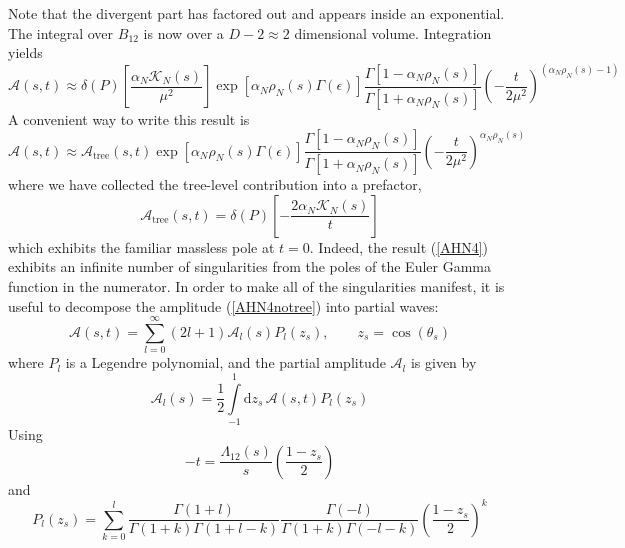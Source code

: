 Note that the divergent part has factored out and appears inside an exponential. The integral over $B_{12}$ is now over a $D - 2 \approx 2$ dimensional volume. Integration yields
\begin{equation}
	\mathcal{A}(s, t) \approx \delta(P) \left[ \frac{\alpha_{N} \mathcal{K}_{N}(s)}{\mu^{2}} \right] \exp{\left[ \alpha_{N} \rho_{N}(s) \Gamma(\epsilon) \right]} \frac{\Gamma[1 - \alpha_{N} \rho_{N}(s)]}{\Gamma[1 + \alpha_{N} \rho_{N}(s)]} \left( - \frac{t}{2 \mu^{2}} \right)^{(\alpha_{N} \rho_{N}(s) - 1)} \label{AHN4notree}
\end{equation}
A convenient way to write this result is
\begin{equation}
	\mathcal{A}(s, t) \approx \mathcal{A}_{\text{tree}}(s, t) \exp{\left[ \alpha_{N} \rho_{N}(s) \Gamma(\epsilon) \right]} \frac{\Gamma[1 - \alpha_{N} \rho_{N}(s)]}{\Gamma[1 + \alpha_{N} \rho_{N}(s)]} \left( - \frac{t}{2 \mu^{2}} \right)^{\alpha_{N} \rho_{N}(s)} \label{AHN4}
\end{equation}
where we have collected the tree-level contribution into a prefactor,
\begin{equation}
	\mathcal{A}_{\text{tree}}(s, t) = \delta(P) \left[ - \frac{2 \alpha_{N} \mathcal{K}_{N}(s)}{t} \right]
\end{equation}
which exhibits the familiar massless pole at $t = 0$. Indeed, the result (\ref{AHN4}) exhibits an infinite number of singularities from the poles of the Euler Gamma function in the numerator. In order to make all of the singularities manifest, it is useful to decompose the amplitude (\ref{AHN4notree}) into partial waves:
\begin{equation}
	\mathcal{A}(s, t) = \sum_{l = 0}^{\infty} (2l + 1) \mathcal{A}_{l}(s) P_{l}(z_{s}), \qquad z_{s} = \cos{(\theta_{s})}
\end{equation}
where $P_{l}$ is a Legendre polynomial, and the partial amplitude $\mathcal{A}_{l}$ is given by
\begin{equation}
	\mathcal{A}_{l}(s) = \frac{1}{2} \int\limits_{-1}^{1} \mathrm{d}z_{s} \, \mathcal{A}(s, t) P_{l}(z_{s})
\end{equation}
Using
\begin{equation}
	{-t} = \frac{\Lambda_{12}(s)}{s} \left( \frac{1 - z_{s}}{2} \right)
\end{equation}
and
\begin{equation}
	P_{l}(z_{s}) = \sum_{k = 0}^{l} \frac{\Gamma(1 + l)}{\Gamma(1 + k) \Gamma(1 + l - k)} \frac{\Gamma(-l)}{\Gamma(1 + k) \Gamma(-l-k)} \left( \frac{1 - z_{s}}{2} \right)^{k}
\end{equation}
